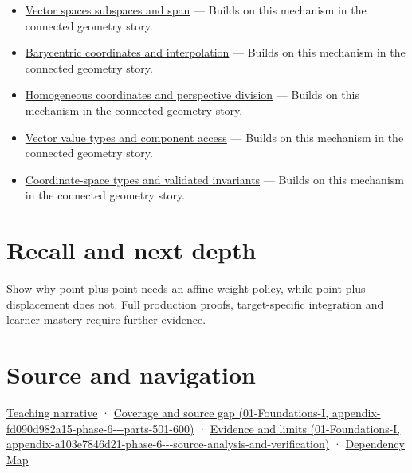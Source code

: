 \begin{itemize}
\tightlist
\item
  \hyperref[appendix-173b52c063ae]{Vector spaces subspaces and span} --- Builds on this mechanism in the connected geometry story.
\item
  \hyperref[appendix-02b9d9a81dca]{Barycentric coordinates and interpolation} --- Builds on this mechanism in the connected geometry story.
\item
  \hyperref[appendix-cb3b26862282]{Homogeneous coordinates and perspective division} --- Builds on this mechanism in the connected geometry story.
\item
  \hyperref[appendix-37a39984ba66]{Vector value types and component access} --- Builds on this mechanism in the connected geometry story.
\item
  \hyperref[appendix-380a220e2529]{Coordinate-space types and validated invariants} --- Builds on this mechanism in the connected geometry story.
\end{itemize}

\section{Recall and next depth}\label{appendix-0659864c0aa3-recall-and-next-depth}

Show why point plus point needs an affine-weight policy, while point plus displacement does not. Full production proofs, target-specific integration and learner mastery require further evidence.

\section{Source and navigation}\label{appendix-0659864c0aa3-source-and-navigation}

\href{Continuous\%20Notes/Computing\%20Foundations\%20-\%20From\%20Bits\%20to\%20C++\%20and\%20Systems\%20APIs\#An\%20arrow\%20is\%20not\%20the\%20address\%20written\%20beside\%20it}{Teaching narrative} · \href{../01-Foundations-I/main.pdf\#nameddest=appendix-fd090d982a15-phase-6---parts-501-600}{Coverage and source gap (01-Foundations-I, appendix-fd090d982a15-phase-6-\/-\/-parts-501-600)} · \href{../01-Foundations-I/main.pdf\#nameddest=appendix-a103e7846d21-phase-6---source-analysis-and-verification}{Evidence and limits (01-Foundations-I, appendix-a103e7846d21-phase-6-\/-\/-source-analysis-and-verification)} · \hyperref[appendix-4ad47bdd269a]{Dependency Map}
